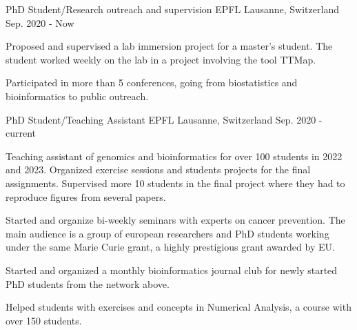 

\begin{cventries}
  \cventry
    {PhD Student/Research outreach and supervision} %
    {EPFL} %
    {Lausanne, Switzerland} %
    {Sep. 2020 - Now} %
    {
      \begin{cvitems} %
          \item Proposed and supervised a lab immersion project for a 
                master's student. The student worked weekly on the lab in a 
                project involving the tool TTMap.
          \item Participated in more than 5 conferences, going from 
                biostatistics and bioinformatics to public outreach. 
      \end{cvitems}
    }
 
 \cventry
    {PhD Student/Teaching Assistant} %
    {EPFL} %
    {Lausanne, Switzerland} %
    {Sep. 2020 - current} %
    {
      \begin{cvitems} %
          \item Teaching assistant of genomics and bioinformatics for over 100 
                students in 2022 and 2023. Organized exercise sessions and 
                students projects for the final assignments. Supervised more
                10 students in the final project where they had to reproduce
                figures from several papers.
          \item Started and organize bi-weekly seminars with experts on cancer
                prevention. The main audience is a group of european 
                researchers and PhD students working under the same Marie Curie
                grant, a highly prestigious grant awarded by EU.  
          \item Started and organized a monthly bioinformatics journal club for
                newly started PhD students from the network above.
          \item Helped students with exercises and concepts in 
                Numerical Analysis, a course with over 150 students.
      \end{cvitems}
    }


\end{cventries}
